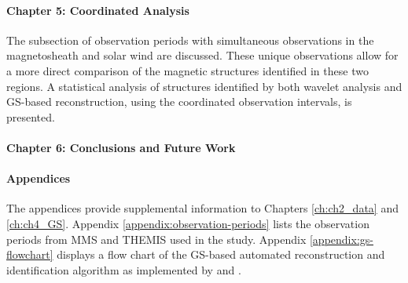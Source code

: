 \paragraph*{Chapter 5: Coordinated Analysis}
The subsection of observation periods with simultaneous observations in the magnetosheath and solar wind are discussed. These unique observations allow for a more direct comparison of the magnetic structures identified in these two regions. A statistical analysis of structures identified by both wavelet analysis and GS-based reconstruction, using the coordinated observation intervals, is presented.

\paragraph*{Chapter 6: Conclusions and Future Work}

\paragraph*{Appendices}
The appendices provide supplemental information to Chapters \ref{ch:ch2_data} and \ref{ch:ch4_GS}. Appendix \ref{appendix:observation-periods} lists the observation periods from MMS and THEMIS used in the study. Appendix \ref{appendix:gs-flowchart} displays a flow chart of the GS-based automated reconstruction and identification algorithm as implemented by \cite{Hu:2018} and \cite{Zheng:2018}.